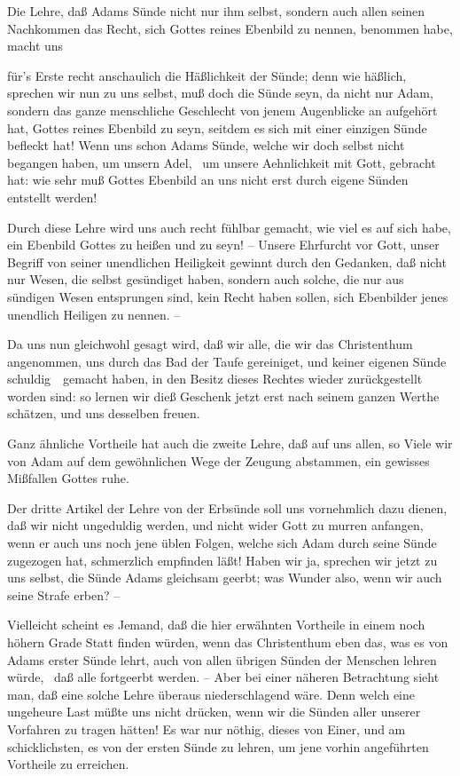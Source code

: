 \begin{aufza}
\item Die Lehre, daß Adams Sünde nicht nur ihm selbst, sondern auch allen seinen Nachkommen das Recht, sich Gottes reines Ebenbild zu nennen, benommen habe, macht uns
\begin{aufzb}
\item für's Erste recht anschaulich die Häßlichkeit der Sünde; denn wie häßlich, sprechen wir nun zu uns selbst, muß doch die Sünde seyn, da nicht nur Adam, sondern das ganze menschliche Geschlecht von jenem Augenblicke an aufgehört hat, Gottes reines Ebenbild zu seyn, seitdem es sich mit einer einzigen Sünde befleckt hat! Wenn uns schon Adams Sünde, welche wir doch selbst nicht begangen haben, um unsern Adel, \dh\ um unsere Aehnlichkeit mit Gott, gebracht hat: wie sehr muß Gottes Ebenbild an uns nicht erst durch eigene Sünden entstellt werden!
\item Durch diese Lehre wird uns auch recht fühlbar gemacht, wie viel es auf sich habe, ein Ebenbild Gottes zu heißen und zu seyn! -- Unsere Ehrfurcht vor Gott, unser Begriff von seiner unendlichen Heiligkeit gewinnt durch den Gedanken, daß nicht nur Wesen, die selbst gesündiget haben, sondern auch solche, die nur aus sündigen Wesen entsprungen sind, kein Recht haben sollen, sich Ebenbilder jenes unendlich Heiligen zu nennen. --
\item Da uns nun gleichwohl gesagt wird, daß wir alle, die wir das Christenthum angenommen, uns durch das Bad der Taufe gereiniget, und keiner eigenen Sünde schuldig~\ gemacht haben, in den Besitz dieses Rechtes wieder zurückgestellt worden sind: so lernen wir dieß Geschenk jetzt erst nach seinem ganzen Werthe schätzen, und uns desselben freuen.
\end{aufzb}
\item Ganz ähnliche Vortheile hat auch die zweite Lehre, daß auf uns allen, so Viele wir von Adam auf dem gewöhnlichen Wege der Zeugung abstammen, ein gewisses Mißfallen Gottes ruhe.
\item Der dritte Artikel der Lehre von der Erbsünde soll uns vornehmlich dazu dienen, daß wir nicht ungeduldig werden, und nicht wider Gott zu murren anfangen, wenn er auch uns noch jene üblen Folgen, welche sich Adam durch seine Sünde zugezogen hat, schmerzlich empfinden läßt! Haben wir ja, sprechen wir jetzt zu uns selbst, die Sünde Adams gleichsam geerbt; was Wunder also, wenn wir auch seine Strafe erben? --
\begin{RWanm} 
Vielleicht scheint es Jemand, daß die hier erwähnten Vortheile in einem noch höhern Grade Statt finden würden, wenn das Christenthum eben das, was es von Adams erster Sünde lehrt, auch von allen übrigen Sünden der Menschen lehren würde, \dh\ daß alle fortgeerbt werden. -- Aber bei einer näheren Betrachtung sieht man, daß eine solche Lehre überaus niederschlagend wäre. Denn welch eine ungeheure Last müßte uns nicht drücken, wenn wir die Sünden aller unserer Vorfahren zu tragen hätten! Es war nur nöthig, dieses von Einer, und am schicklichsten, es von der ersten Sünde zu lehren, um jene vorhin angeführten Vortheile zu erreichen. 
\end{RWanm}
\end{aufza}


